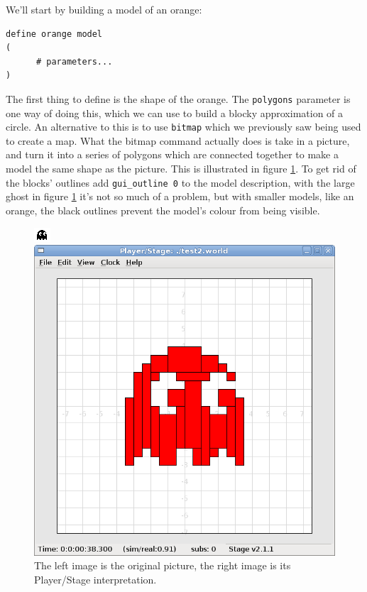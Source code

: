 \documentclass[a4paper]{report}
\newcommand{\plst}{Player/Stage\xspace}
\begin{document}
We'll start by building a model of an orange:
\begin{verbatim}
define orange model
(
      # parameters...
)
\end{verbatim}
The first thing to define is the shape of the orange. The \verb|polygons| parameter is one way of doing this, which we can use to build a blocky approximation of a circle. An alternative to this is to use \verb|bitmap| which we previously saw being used to create a map. What the bitmap command actually does is take in a picture, and turn it into a series of polygons which are connected together to make a model the same shape as the picture. This is illustrated in figure \ref{fig:ghosts}. To get rid of the blocks' outlines add \verb|gui_outline 0| to the model description, with the large ghost in figure \ref{fig:ghosts} it's not so much of a problem, but with smaller models, like an orange, the black outlines prevent the model's colour from being visible.

\begin{figure}
	\centering
	\begin{minipage}[c]{0.3\linewidth}
		\centering
		\includegraphics{./pics/oranges_box/ghost_original.png} %
		
	\end{minipage}%
	\hspace{0.05\linewidth}
	\begin{minipage}[c]{0.6\linewidth}
		\centering
		\includegraphics[width=\linewidth]{./pics/oranges_box/ghost_woutline.png} 
	\end{minipage}	
	\caption{The left image is the original picture, the right image is its \plst interpretation.}
		\label{fig:ghosts}
\end{figure}
\end{document}
